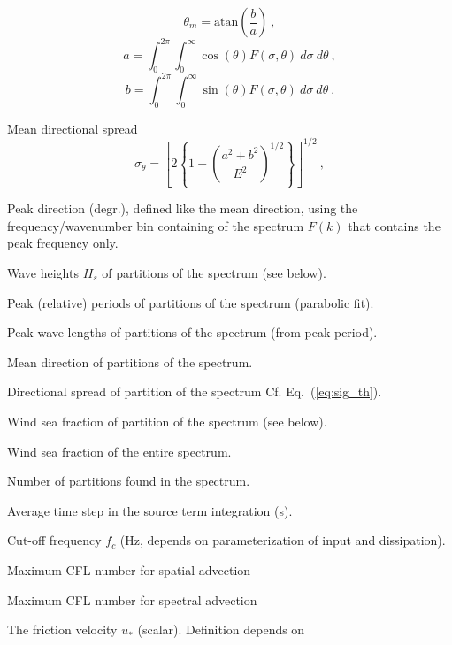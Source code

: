 \begin{list}{)\hfill}
      \begin{equation} \theta_m = \mbox{atan} \left ( \frac{b}{a} \right )
      \: , \label{eq:theta_m} \end{equation} \begin{equation}
      a = \int_0^{2\pi} \int_0^\infty \cos(\theta) F(\sigma,\theta) \:
      d\sigma \: d\theta \: , \end{equation} \begin{equation}
      b = \int_0^{2\pi} \int_0^\infty \sin(\theta) F(\sigma,\theta) \:
      d\sigma \: d\theta \: . \end{equation}
\item Mean directional spread \citep[degr.;][]{art:KVH88}
      \begin{equation} \sigma_\theta = \left [ 2 \left \{ 1 - \left (
      \frac{a^2+b^2}{E^2} \right )^{1/2} \right \} \right ]^{1/2}
      \: , \label{eq:sig_th} \end{equation}
\item Peak direction (degr.), defined like the mean direction, using the
      frequency/wavenumber bin containing of the spectrum $F(k)$ that
      contains the peak frequency only.
\item Wave heights $H_s$ of partitions of the spectrum (see
      below). \label{out:first_part}
\item Peak (relative) periods of partitions of the spectrum (parabolic fit).
\item Peak wave lengths of partitions of the spectrum (from peak period).
\item Mean direction of partitions of the spectrum.
\item Directional spread of partition of the spectrum
      Cf. Eq.~(\ref{eq:sig_th}).
\item Wind sea fraction of partition of the spectrum (see below).
\item Wind sea fraction of the entire spectrum.
\item Number of partitions found in the spectrum. \label{out:last_part}
\item Average time step in the source term integration (s).
\item Cut-off frequency $f_c$ (Hz, depends on parameterization of
      input and dissipation).
\item Maximum CFL number for spatial advection 
\item Maximum CFL number for spectral advection 
\item The friction velocity $u_\ast$ (scalar). Definition depends on

\end{list}
